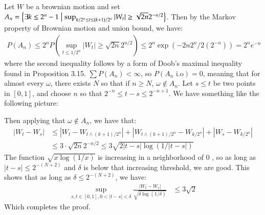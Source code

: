 \documentclass[12pt]{article}
\theoremstyle{definitionstyle}
\newcommand{\SET}[1]{\Set{\mskip-\medmuskip #1 \mskip-\medmuskip}}
\newcommand{\1}{\mathds 1}
\begin{document}
    Let $W$ be a brownian motion and set $A_n = \SET{\exists k \leq 2^n - 1 | \sup_{k/2^n \leq t \leq (k+1)/2^n} |W_t| \geq \sqrt {2n} 2^{-n/2}}$. Then by the Markov property of Brownian motion and union bound, we have:
    \begin{align*}
        P(A_n) \leq 2^n P(\sup_{t \leq 1/2^n} |W_t| \geq \sqrt {2n}2^{n/2}) \leq 2^n \exp(-2n 2^{n} / 2(2^{-n})) = 2^n e^{-n}
    \end{align*}
    where the second inequality follows by a form of Doob's maximal inequality found in Proposition 3.15. $\sum P(A_n) < \infty$, so $P(A_n \text{ i.o}) = 0$, meaning that for almost every $\omega$, there exists $N$ so that if $n \geq N$, $\omega \not \in A_n$. Let $s \leq t$ be two points in $[0,1]$, and choose $n$ so that $2^{-n} \leq t-s \leq 2^{-n+1}$. We have something like the following picture:
    \begin{figure}[H]
        \centering
    \end{figure}
    Then applying that $\omega \not \in A_{n}$, we have that:
    \begin{align*}
        |W_t - W_s| &\leq |W_t - W_{t \land (k+1)/2^{n}}| + |W_{t \land (k+1)/2^{n}} - W_{k/2^n}| + |W_s - W_{k/2^{n}}| \\
        &\leq 3 \cdot \sqrt{2n} 2^{-n/2} \leq 3\sqrt{2 |t-s|\log(1/|t-s|)} 
    \end{align*}
    The function $\sqrt{x\log(1/x)}$ is increasing in a neighborhood of 0 , so as long as $|t-s| \leq 2^{-(N+2)}$ and $\delta$ is below that increasing threshold, we are good. This shows that as long as $\delta \leq 2^{-(N+2)}$, we have:
    \begin{align*}
        \sup_{s, t \in [0,1], 0 < |t-s| < \delta} \frac{|W_t - W_s|}{\sqrt{\delta \log(1/\delta)}} &\leq 3\sqrt{2}
    \end{align*}
    Which completes the proof.
\end{document}
